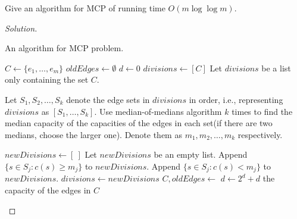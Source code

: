 



    \begin{thm}{}{}
        Give an algorithm for MCP of running time $O(m\log\log m)$.
    \end{thm}
    \begin{proof}[Solution]
        \ 
        
        \begin{algorithm}
            \caption{An algorithm for MCP problem.}
            \begin{algorithmic}
                    \State $C\gets \{e_1,\ldots,e_m\}$
                    \State $oldEdges \gets \emptyset$
                    \State $d\gets 0$
                     
                        \State $divisions\gets [C]$ \Comment Let $divisions$ be a list only containing the set $C$.
                         
                        
                            \State Let $S_1, S_2, \ldots, S_k$ denote the edge sets in $divisions$ in order, i.e., representing $divisions$ as $[S_1, \ldots, S_k]$.
                            \State Use median-of-medians algorithm $k$ times to find the median capacity of the capacities of the edges in each set(if there are two medians, choose the larger one). Denote them as $m_1, m_2, \ldots, m_k$ respectively.
                            
                            \State $newDivisions \gets [\ ]$ \Comment Let $newDivisions$ be an empty list.
                             
                            \State Append $\{s\in S_{j}:c(s) \geqslant m_{j}\}$ to $newDivisions$.
                            \State Append $\{s\in S_{j}:c(s) < m_{j}\}$ to $newDivisions$.
                            \EndFor
                            \State $divisions \gets newDivisions$
                        \EndFor
                        \State $C, oldEdges\gets$  %
                    \State $d\gets 2^{d}+d$
                    \EndWhile
                    \State \Return the capacity of the edges in $C$
                \EndFunction
                

\end{algorithmic}
\end{algorithm}
\end{proof}
